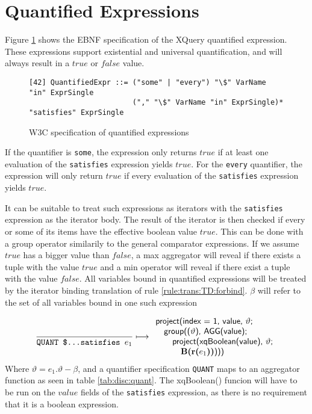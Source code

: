 \section{Quantified Expressions}
\label{sect:disc:not:quantified}

Figure \ref{fig:disc:not:quantified} shows the EBNF specification of the XQuery quantified expression. These
expressions support existential and universal quantification, and will always result in a $true$ or $false$ value.

\begin{figure}[h]
\begin{Verbatim}
[42] QuantifiedExpr ::= ("some" | "every") "\$" VarName "in" ExprSingle 
                        ("," "\$" VarName "in" ExprSingle)* "satisfies" ExprSingle
\end{Verbatim}
\caption{W3C specification of quantified expressions \cite{w3c00} \label{fig:disc:not:quantified}}
\end{figure}

If the quantifier is \texttt{some}, the expression only returns $true$ if at least one evaluation of the
\texttt{satisfies} expression yields $true$. For the \texttt{every} quantifier, the expression will only return
$true$ if every evaluation of the \texttt{satisfies} expression yields $true$.

It can be suitable to treat such expressions as iterators with the \texttt{satisfies} expression as the iterator
body. The result of the iterator is then checked if every or some of its items have the effective boolean value
$true$. This can be done with a \textsf{group} operator similarily to the general comparator expressions. If we
assume $true$ has a bigger value than $false$, a \textsf{max} aggregator will reveal if there exists a tuple with
the value $true$ and a \textsf{min} operator will reveal if there exist a tuple with the value $false$. All
variables bound in quantified expressions will be treated by the iterator binding translation of rule
\ref{rule:trans:TD:forbind}. $\beta$ will refer to the set of all variables bound in one such expression

\begin{equation}
\frac{}{\mbox{\texttt{QUANT \$\ldots  satisfies }}e_1} \longmapsto
\begin{array}{l}
\mbox{\textsf{project(index = 1, value, }}\vartheta\mbox{\textsf{;}} \\ \quad
\mbox{\textsf{group((}}\vartheta\mbox{\textsf{), AGG(value);}} \\ \quad\quad
\mbox{\textsf{project(xqBoolean(value), }}\vartheta\mbox{\textsf{;}} \\ \quad\quad\quad
\mbox{\textbf{B(r(}}e_1\mbox{\textbf{))}\textsf{)))}}
\end{array}
\label{rule:trans:TD:quantified}
\end{equation}
Where $\vartheta=e_1.\vartheta-\beta$, and a quantifier specification \texttt{QUANT} maps to an aggregator
function as seen in table \ref{tab:disc:quant}. The \textsf{xqBoolean()} funcion will have to be run on the
$value$ fields of the \texttt{satisfies} expression, as there is no requirement that it is a boolean expression.

